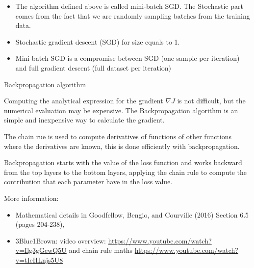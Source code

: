 \documentclass[10pt,ignorenonframetext,]{beamer}
\providecommand{\tightlist}{%
  \setlength{\itemsep}{0pt}\setlength{\parskip}{0pt}}
\begin{document}
\begin{frame}

\begin{itemize}
\tightlist
\item
  The algorithm defined above is called mini-batch SGD. The Stochastic
  part comes from the fact that we are randomly sampling batches from
  the training data.
\item
  Stochastic gradient descent (SGD) for size equals to 1.
\item
  Mini-batch SGD is a compromise between SGD (one sample per iteration)
  and full gradient descent (full dataset per iteration)
\end{itemize}

\end{frame}

\begin{frame}

\begin{block}{Backpropagation algorithm}

Computing the analytical expression for the gradient \(\nabla J\) is not
difficult, but the numerical evaluation may be expensive. The
Backpropagation algorithm is an simple and inexpensive way to calculate
the gradient.

The chain rue is used to compute derivatives of functions of other
functions where the derivatives are known, this is done efficiently with
backpropagation.

Backpropagation starts with the value of the loss function and works
backward from the top layers to the bottom layers, applying the chain
rule to compute the contribution that each parameter have in the loss
value.

\end{block}

\end{frame}

\begin{frame}

More information:

\begin{itemize}
\tightlist
\item
  Mathematical details in Goodfellow, Bengio, and Courville (2016)
  Section 6.5 (pages 204-238),
\item
  3Blue1Brown: video overview:
  \url{https://www.youtube.com/watch?v=Ilg3gGewQ5U} and chain rule maths
  \url{https://www.youtube.com/watch?v=tIeHLnjs5U8}
\end{itemize}

\end{frame}
\end{document}
